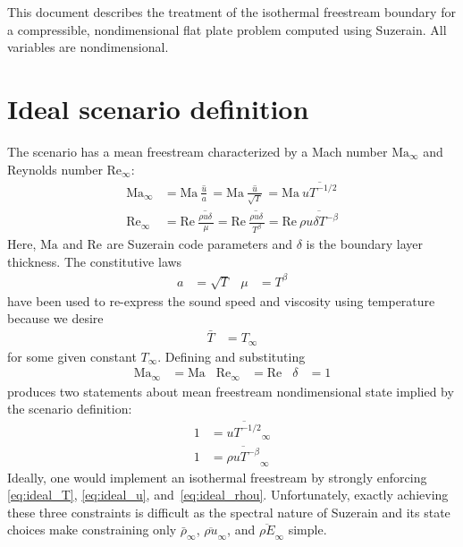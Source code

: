 \documentclass[letterpaper,11pt,nointlimits,reqno]{amsart}
\newcommand{\Mach}[1][]{\mbox{Ma}_{#1}}
\newcommand{\Reynolds}[1][]{\mbox{Re}_{#1}}
\begin{document}
This document describes the treatment of the isothermal freestream boundary for
a compressible, nondimensional flat plate problem computed using Suzerain.  All
variables are nondimensional.

\section{Ideal scenario definition}

The scenario has a mean freestream characterized by a Mach number
$\Mach[\infty]$ and Reynolds number $\Reynolds[\infty]$:
\begin{align}
  \label{eq:def_mach}
  \Mach[\infty]{}
  &= \Mach{} \overline{\,\frac{u}{a}\,}
   = \Mach{} \overline{\,\frac{u}{\sqrt{T}}\,}
   = \Mach\, \overline{u T^{-1/2}}
\\
  \label{eq:def_reynolds}
  \Reynolds[\infty]{}
  &= \Reynolds{} \overline{\,\frac{\rho u \delta\,} {\mu}}
   = \Reynolds{} \overline{\,\frac{\rho u \delta\,} {T^\beta}}
   = \Reynolds\, \overline{\rho u \delta T^{-\beta}}
\end{align}
Here, $\Mach$ and $\Reynolds$ are Suzerain code parameters and $\delta$ is the
boundary layer thickness.  The constitutive laws
\begin{align}
  a &= \sqrt{T}
&\mu &= {T}^\beta
\end{align}
have been used to re-express the sound speed and viscosity using temperature
because we desire
\begin{align}
  \label{eq:ideal_T}
  \bar{T} &= T_\infty
\end{align}
for some given constant $T_\infty$.  Defining and substituting
\begin{align}
  \Mach[\infty]{} &= \Mach
& \Reynolds[\infty]{} &= \Reynolds
& \delta &= 1
\end{align}
produces two statements about mean freestream nondimensional state implied by
the scenario definition:
\begin{align}
  \label{eq:ideal_u}
  1 &= \overline{u T^{-1/2}}_\infty
\\
  \label{eq:ideal_rhou}
  1 &= \overline{\rho u T^{-\beta}}_\infty
\end{align}
Ideally, one would implement an isothermal freestream by strongly enforcing
\eqref{eq:ideal_T}, \eqref{eq:ideal_u}, and~\eqref{eq:ideal_rhou}.
Unfortunately, exactly achieving these three constraints is difficult as the
spectral nature of Suzerain and its state choices make constraining only
$\bar{\rho}_\infty$, $\overline{\rho{}u}_\infty$, and
$\overline{\rho{}E}_\infty$ simple.
\end{document}
